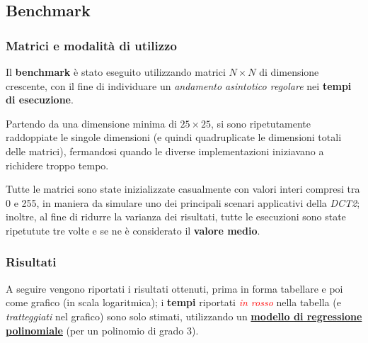 \subsection{Benchmark}
\subsubsection{Matrici e modalità di utilizzo}
    Il \textbf{benchmark} è stato eseguito utilizzando matrici $N \times N$ di dimensione crescente, con il fine di individuare un \textit{andamento asintotico regolare} nei \textbf{tempi di esecuzione}. 
    
    Partendo da una dimensione minima di $25 \times 25$, si sono ripetutamente raddoppiate le singole dimensioni (e quindi quadruplicate le dimensioni totali delle matrici), fermandosi quando le diverse implementazioni iniziavano a richidere troppo tempo.   

    Tutte le matrici sono state inizializzate casualmente con valori interi compresi tra 0 e 255, in maniera da simulare uno dei principali scenari applicativi della \textit{DCT2}; inoltre, al fine di ridurre la varianza dei risultati, tutte le esecuzioni sono state ripetutute tre volte e se ne è considerato il \textbf{valore medio}.
    
\subsubsection{Risultati}
    A seguire vengono riportati i risultati ottenuti, prima in forma tabellare e poi come grafico (in scala logaritmica); i \textbf{tempi} riportati \textcolor{red}{\textit{in rosso}} nella tabella (e \textit{tratteggiati} nel grafico) sono solo stimati, utilizzando un \href{https://numpy.org/doc/stable/reference/generated/numpy.polyfit.html}{\textbf{modello di regressione polinomiale}} (per un polinomio di grado 3).

